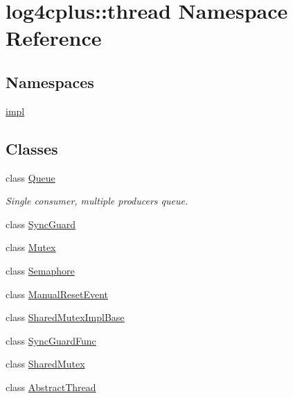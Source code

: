 \hypertarget{namespacelog4cplus_1_1thread}{\section{log4cplus\-:\-:thread Namespace Reference}
\label{namespacelog4cplus_1_1thread}
}
\subsection*{Namespaces}
\begin{DoxyCompactItemize}
\item 
\hyperlink{namespacelog4cplus_1_1thread_1_1impl}{impl}
\end{DoxyCompactItemize}
\subsection*{Classes}
\begin{DoxyCompactItemize}
\item 
class \hyperlink{classlog4cplus_1_1thread_1_1Queue}{Queue}
\begin{DoxyCompactList}\small\item\em Single consumer, multiple producers queue. \end{DoxyCompactList}\item 
class \hyperlink{classlog4cplus_1_1thread_1_1SyncGuard}{Sync\-Guard}
\item 
class \hyperlink{classlog4cplus_1_1thread_1_1Mutex}{Mutex}
\item 
class \hyperlink{classlog4cplus_1_1thread_1_1Semaphore}{Semaphore}
\item 
class \hyperlink{classlog4cplus_1_1thread_1_1ManualResetEvent}{Manual\-Reset\-Event}
\item 
class \hyperlink{classlog4cplus_1_1thread_1_1SharedMutexImplBase}{Shared\-Mutex\-Impl\-Base}
\item 
class \hyperlink{classlog4cplus_1_1thread_1_1SyncGuardFunc}{Sync\-Guard\-Func}
\item 
class \hyperlink{classlog4cplus_1_1thread_1_1SharedMutex}{Shared\-Mutex}
\item 
class \hyperlink{classlog4cplus_1_1thread_1_1AbstractThread}{Abstract\-Thread}
\end{DoxyCompactItemize}
